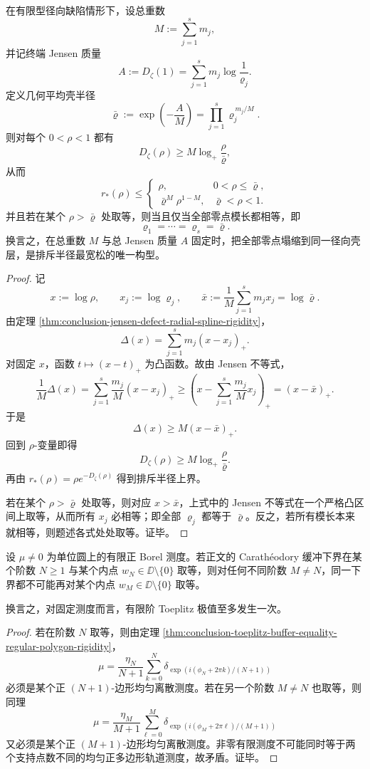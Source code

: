 \begin{theorem}[固定总缺陷质量下的等壳最优原理]\label{thm:conclusion-equal-shell-extremal-principle}
在有限型径向缺陷情形下，设总重数
\[
M:=\sum_{j=1}^{s}m_j,
\]
并记终端 Jensen 质量
\[
A:=D_\zeta(1)=\sum_{j=1}^{s}m_j\log\frac{1}{\varrho_j}.
\]
定义几何平均壳半径
\[
\bar\varrho:=
\exp\!\left(-\frac{A}{M}\right)
=
\prod_{j=1}^{s}\varrho_j^{\,m_j/M}.
\]
则对每个 \(0<\rho<1\) 都有
\[
D_\zeta(\rho)\ge M\log_+\frac{\rho}{\bar\varrho},
\]
从而
\[
r_*(\rho)\le
\begin{cases}
\rho,& 0<\rho\le \bar\varrho,\\[4pt]
\bar\varrho^{M}\rho^{1-M},& \bar\varrho<\rho<1.
\end{cases}
\]
并且若在某个 \(\rho>\bar\varrho\) 处取等，则当且仅当全部零点模长都相等，即
\[
\varrho_1=\cdots=\varrho_s=\bar\varrho.
\]
换言之，在总重数 \(M\) 与总 Jensen 质量 \(A\) 固定时，把全部零点塌缩到同一径向壳层，是排斥半径最宽松的唯一构型。
\end{theorem}
\begin{proof}
记
\[
x:=\log \rho,
\qquad
x_j:=\log \varrho_j,
\qquad
\bar x:=\frac{1}{M}\sum_{j=1}^{s}m_jx_j=\log\bar\varrho.
\]
由定理 \ref{thm:conclusion-jensen-defect-radial-spline-rigidity}，
\[
\Delta(x)=\sum_{j=1}^{s}m_j(x-x_j)_+.
\]
对固定 \(x\)，函数 \(t\mapsto (x-t)_+\) 为凸函数。故由 Jensen 不等式，
\[
\frac{1}{M}\Delta(x)
=
\sum_{j=1}^{s}\frac{m_j}{M}(x-x_j)_+
\ge
\left(x-\sum_{j=1}^{s}\frac{m_j}{M}x_j\right)_+
=(x-\bar x)_+.
\]
于是
\[
\Delta(x)\ge M(x-\bar x)_+.
\]
回到 \(\rho\)-变量即得
\[
D_\zeta(\rho)\ge M\log_+\frac{\rho}{\bar\varrho}.
\]
再由 \(r_*(\rho)=\rho e^{-D_\zeta(\rho)}\) 得到排斥半径上界。

若在某个 \(\rho>\bar\varrho\) 处取等，则对应 \(x>\bar x\)，上式中的 Jensen 不等式在一个严格凸区间上取等，从而所有 \(x_j\) 必相等；即全部 \(\varrho_j\) 都等于 \(\bar\varrho\)。反之，若所有模长本来就相等，则题述各式处处取等。证毕。
\end{proof}

\begin{corollary}[极值阶数的一次性原理]\label{cor:conclusion-toeplitz-extremality-one-shot}
设 \(\mu\neq 0\) 为单位圆上的有限正 Borel 测度。若正文的 Carath\'eodory 缓冲下界在某个阶数 \(N\ge 1\) 与某个内点 \(w_N\in\DD\setminus\{0\}\) 取等，则对任何不同阶数 \(M\neq N\)，同一下界都不可能再对某个内点 \(w_M\in\DD\setminus\{0\}\) 取等。

换言之，对固定测度而言，有限阶 Toeplitz 极值至多发生一次。
\end{corollary}
\begin{proof}
若在阶数 \(N\) 取等，则由定理 \ref{thm:conclusion-toeplitz-buffer-equality-regular-polygon-rigidity}，
\[
\mu=\frac{\eta_N}{N+1}\sum_{k=0}^{N}
\delta_{\exp(i(\phi_N+2\pi k)/(N+1))}
\]
必须是某个正 \((N+1)\)-边形均匀离散测度。若在另一个阶数 \(M\neq N\) 也取等，则同理
\[
\mu=\frac{\eta_M}{M+1}\sum_{\ell=0}^{M}
\delta_{\exp(i(\phi_M+2\pi \ell)/(M+1))}
\]
又必须是某个正 \((M+1)\)-边形均匀离散测度。非零有限测度不可能同时等于两个支持点数不同的均匀正多边形轨道测度，故矛盾。证毕。
\end{proof}

